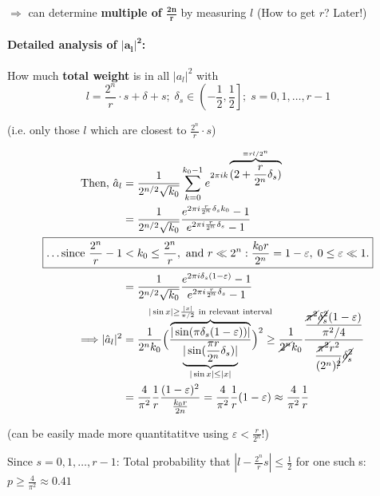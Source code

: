 \documentclass[a4paper, 12pt]{article}
\theoremstyle{plain}
\theoremstyle{definition}
\theoremstyle{remark}
\begin{document}
$\Longrightarrow$ can determine \textbf{multiple of $\bm{\frac{2n}{r}}$} by measuring $l$ (How to get $r$? Later!)

\paragraph{Detailed analysis of $\bm{|a_l|^2}$:}
How much \textbf{total weight} is in all $|a_l|^2$ with
\begin{equation*}
  l=\frac{2^n}{r}\cdot s + \delta+s;\; \delta_s \in \left(-\frac{1}{2}, \frac{1}{2}\right];\; s = 0,1,\ldots,r-1
\end{equation*}
\begin{center}
  (i.e. only those $l$ which are closest to $\frac{2^n}{r}\cdot s$)
\end{center}
\begin{align*}
  \text{Then, }\hat{a}_l &=\frac{1}{2^{n/2}\sqrt{k_0}}  \sum_{k=0}^{k_0-1} e^{2\pi i k\overbrace{(2+\frac{r}{2^n}\delta_s)}^{\equiv rl/2^n}} \\
  &= \frac{1}{2^{n/2}\sqrt{k_0}} \frac{e^{2\pi i \frac{r}{2^n}\delta_s k_0} - 1}{e^{2\pi i \frac{r}{2^n}\delta_s} - 1}\\[\parskip]
  \Aboxed{\text{\ldots since } \frac{2^n}{r}-1 &< k_0 \leq \frac{2^n}{r},\text{ and } r \ll 2^n:
  \frac{k_0 r}{2^n} = 1 - \varepsilon,\; 0 \leq \varepsilon \ll 1.}\\[\parskip]
  &= \frac{1}{2^{n/2}\sqrt{k_0}} \frac{e^{2\pi i \delta_s (1-\varepsilon)} - 1}{e^{2\pi i \frac{r}{2^n}\delta_s} - 1}\\[2\parskip]
  \Longrightarrow |\hat{a}_l|^2 &= \frac{1}{2^n k_0} \Big(\frac{\overbrace{|\sin(\pi \delta_s (1-\varepsilon))|}^{\mathclap{|\sin x|\geq \frac{|x|}{\pi/2}\text{ in relevant interval}}}}{\underbrace{|\sin(\frac{\pi r}{2^n} \delta_s)|}_{|\sin x| \leq |x|}}\Big)^2
  \geq \frac{1}{\cancel{2^n} k_0} \frac{\displaystyle \frac{\cancel{\pi ^2} \cancel{\delta_s^2} (1-\varepsilon)}{\pi^2/4}}{\displaystyle\frac{\cancel{\pi^2} r^2}{(2^n)^{\cancel{2}}}\cancel{\delta_s^2}}\\[\parskip]
  &= \frac{4}{\pi^2} \frac{1}{r} \frac{(1-\varepsilon)^2}{\frac{k_0 r}{2n}}= \frac{4}{\pi^2} \frac{1}{r} (1-\varepsilon) \approx \frac{4}{\pi^2}\frac{1}{r}
\end{align*}
\begin{center}
  (can be easily made more quantitatitve using $\varepsilon<\frac{r}{2^n}$!)
\end{center}

Since $s=0,1,\ldots,r-1$: Total probability that $|l-\frac{2^n}{r}s| \leq \frac{1}{2}$ for one such s: $p \geq \frac{4}{\pi^2} \approx 0.41$
\end{document}
